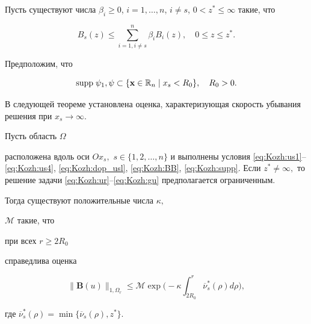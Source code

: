 Пусть существуют числа $\beta_i\geq 0$, $i=1,\ldots,n$, $i\neq s$, $0<z^*\leq \infty$ такие, что

\begin{equation}\label{eq:Kozh:BB}

B_s(z)\leq\sum\limits_{i=1,i\neq s}^n \beta_i B_i(z),\quad 0\leq z\leq z^*.

\end{equation}

Предположим, что

\begin{equation}\label{eq:Kozh:supp}

 {\rm supp}\;  \psi_1,\psi\subset\{{\bf x}\in \mathbb{R}_n \;|\;x_s<R_0\},\quad R_0>0.

\end{equation}



В следующей теореме установлена оценка, характеризующая скорость убывания решения при $x_s \to  \infty$.



\smallskip



\hypertarget{kozh:th3}{}

\begin{theorem}[3]Пусть область $\Omega$

расположена вдоль оси $Ox_s,$ $s\in\{1, 2,\ldots,n\}$ и выполнены условия  \eqref{eq:Kozh:us1}--\eqref{eq:Kozh:us4}{\rm ,} \eqref{eq:Kozh:dop_usl}{\rm ,} \eqref{eq:Kozh:BB}{\rm ,} \eqref{eq:Kozh:supp}{\rm .} Если $z^*\neq \infty,$ то решение задачи \eqref{eq:Kozh:ur}--\eqref{eq:Kozh:gu} предполагается ограниченным{\rm .}

Тогда существуют положительные числа $\kappa,$

$\mathcal{M}$ такие{\rm ,} что

 при всех  $r\geq 2R_0$

справедлива  оценка

\begin{equation}\label{eq:Kozh:the_4}

\|\mathbf{B}(u)\|_{1,\Omega_r}\leq \mathcal{M}

\exp\biggl(-\kappa\int_{2R_0}^r \overline{\nu}_s^*(\rho)d\rho\biggr),

\end{equation}

где $\overline{\nu}_s^*(\rho)=\min\{\overline\nu_s(\rho),z^*\}.$

\end{theorem}



